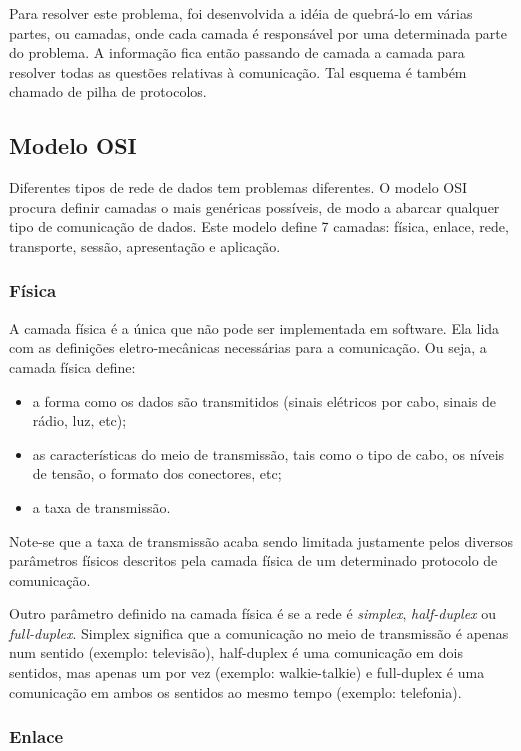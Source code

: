 Para resolver este problema, foi desenvolvida a idéia de quebrá-lo em várias partes, ou camadas, onde cada camada é responsável por uma determinada parte do problema. A informação fica então passando de camada a camada para resolver todas as questões relativas à comunicação. Tal esquema é também chamado de pilha de protocolos.

\subsection{Modelo OSI}
Diferentes tipos de rede de dados tem problemas diferentes. O modelo OSI procura definir camadas o mais genéricas possíveis, de modo a abarcar qualquer tipo de comunicação de dados. Este modelo define 7 camadas: física, enlace, rede, transporte, sessão, apresentação e aplicação.

\subsubsection{Física}
	A camada física é a única que não pode ser implementada em software. Ela lida com as definições eletro-mecânicas necessárias para a comunicação. Ou seja, a camada física define:
	\begin{itemize}
		\item a forma como os dados são transmitidos (sinais elétricos por cabo, sinais de rádio, luz, etc);
		\item as características do meio de transmissão, tais como o tipo de cabo, os níveis de tensão, o formato dos conectores, etc;
		\item a taxa de transmissão.
	\end{itemize}
	Note-se que a taxa de transmissão acaba sendo limitada justamente pelos diversos parâmetros físicos descritos pela camada física de um determinado protocolo de comunicação.

Outro parâmetro definido na camada física é se a rede é \emph{simplex}, \emph{half-duplex} ou \emph{full-duplex}. Simplex significa que a comunicação no meio de transmissão é apenas num sentido (exemplo: televisão), half-duplex é uma comunicação em dois sentidos, mas apenas um por vez (exemplo: walkie-talkie) e full-duplex é uma comunicação em ambos os sentidos ao mesmo tempo (exemplo: telefonia).

\subsubsection{Enlace}


